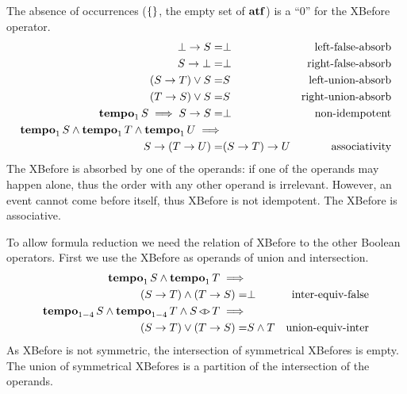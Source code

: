 \documentclass[12pt,openright,twoside,a4paper,oldfontcommands,english,brazil,final]{abntex2}
\theoremstyle{theo}
\def\xbeforeop{\ensuremath\rightarrow}
\newcommand{\xbefore}[2]{\ensuremath #1 \xbeforeop #2 }
\def\tempoop{\ensuremath\operatorname{\mathbf{tempo}}}
\newcommand{\tempo}[2][1-4]{\ensuremath\tempoop_{#1} #2}
\def\independenteventsop{\ensuremath\operatorname{\triangleleft\triangleright}}
\newcommand{\independentevents}[2]{\ensuremath #1 \independenteventsop #2}
\def\False{\ensuremath\operatorname{\left\{\right\}}}
\def\algebraset{\ensuremath\mathbf{atf}}
\newcommand{\parsin}[1]{\ensuremath\left( #1 \right)}
\begin{document}
The absence of occurrences ($\False$, the empty set of $\algebraset$) is a ``0'' for the \ac{XBefore} operator.
%
\begin{subequations}
\begin{align}
\xbefore{\bot}{S} =&
  \bot &
  \text{left-false-absorb}
  \label{thm:xbefore-of-false-1}\\
%
\xbefore{S}{\bot} =&
  \bot &
  \text{right-false-absorb}
  \label{thm:xbefore-of-false-2}\\
%
\left(\xbefore{S}{T}\right) \lor S =& S &
  \text{left-union-absorb}
  \label{thm:xbefore-sup-absorb-1}\\
%
\left(\xbefore{T}{S}\right) \lor S =& S &
  \text{right-union-absorb}
  \label{thm:xbefore-sup-absorb-2}\\
%
\tempo[1]{S} \implies
  \xbefore{S}{S} =&
  \bot &
  \text{non-idempotent}
  \label{thm:xbefore-not-idempotent}\\
%
\tempo[1]{S}\land\tempo[1]{T}\land \tempo[1]{U}\implies&\nonumber\\
  \xbefore{S}{(\xbefore{T}{U})} =&
  \xbefore{(\xbefore{S}{T})}{U} &
  \text{associativity}
  \label{thm:xbefore-associativity}
%
\end{align}
\end{subequations}
%
The \ac{XBefore} is absorbed by one of the operands: if one of the operands may happen alone, thus the order with any other operand is irrelevant.
However, an event cannot come before itself, thus \ac{XBefore} is not idempotent.
The \ac{XBefore} is associative.

To allow formula reduction we need the relation of \ac{XBefore} to the other Boolean operators.
First we use the \ac{XBefore} as operands of union and intersection.
%
\begin{subequations}
\begin{align}
\tempo[1]{S} \land \tempo[1]{T}\implies&\nonumber\\
  \parsin{\xbefore{S}{T}} \land \parsin{\xbefore{T}{S}} =&
  \bot &
  \text{inter-equiv-false}
  \label{thm:xbefore-inf-equiv-bot}\\
%
\tempo{S} \land \tempo{T} \land \independentevents{S}{T}\implies&\nonumber\\
  \parsin{\xbefore{S}{T}} \lor \parsin{\xbefore{T}{S}} =&
  S \land T &
  \text{union-equiv-inter}
  \label{thm:xbefore-sup-equiv-inf}
%
\end{align}
\end{subequations}
%
As \ac{XBefore} is not symmetric, the intersection of symmetrical \acp{XBefore} is empty.
The union of symmetrical \acp{XBefore} is a partition of the intersection of the operands.
\end{document}
